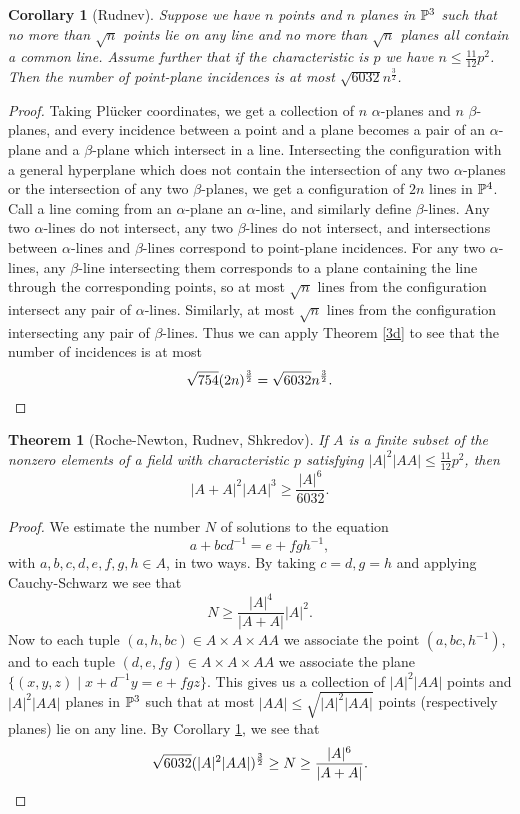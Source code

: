 \documentclass[letterpaper,11pt]{article}
\newtheorem{thm}{Theorem}
\newtheorem{cor}{Corollary}
\theoremstyle{definition}
\theoremstyle{remark}
\begin{document}
\begin{cor}[Rudnev]\label{point-plane} Suppose we have $n$ points and $n$ planes in $\mathbb{P}^3$ such that no more than $\sqrt{n}$ points lie on any line and no more than $\sqrt{n}$ planes all contain a common line. Assume further that if the characteristic is $p$ we have $n \le \frac{11}{12}p^2$. Then the number of point-plane incidences is at most $\sqrt{6032}n^{\frac{3}{2}}$.
\end{cor}
\begin{proof} Taking Pl\"ucker coordinates, we get a collection of $n$ $\alpha$-planes and $n$ $\beta$-planes, and every incidence between a point and a plane becomes a pair of an $\alpha$-plane and a $\beta$-plane which intersect in a line. Intersecting the configuration with a general hyperplane which does not contain the intersection of any two $\alpha$-planes or the intersection of any two $\beta$-planes, we get a configuration of $2n$ lines in $\mathbb{P}^4$. Call a line coming from an $\alpha$-plane an $\alpha$-line, and similarly define $\beta$-lines. Any two $\alpha$-lines do not intersect, any two $\beta$-lines do not intersect, and intersections between $\alpha$-lines and $\beta$-lines correspond to point-plane incidences. For any two $\alpha$-lines, any $\beta$-line intersecting them corresponds to a plane containing the line through the corresponding points, so at most $\sqrt{n}$ lines from the configuration intersect any pair of $\alpha$-lines. Similarly, at most $\sqrt{n}$ lines from the configuration intersecting any pair of $\beta$-lines. Thus we can apply Theorem \ref{3d} to see that the number of incidences is at most
\[
\sqrt{754}(2n)^{\frac{3}{2}} = \sqrt{6032}n^{\frac{3}{2}}.\qedhere
\]
\end{proof}

\begin{thm}[Roche-Newton, Rudnev, Shkredov] If $A$ is a finite subset of the nonzero elements of a field with characteristic $p$ satisfying $|A|^2|AA| \le \frac{11}{12}p^2$, then
\[
|A+A|^2|AA|^3 \ge \frac{|A|^6}{6032}.
\]
\end{thm}
\begin{proof} We estimate the number $N$ of solutions to the equation
\[
a+bcd^{-1} = e + fgh^{-1},
\]
with $a,b,c,d,e,f,g,h \in A$, in two ways. By taking $c=d, g=h$ and applying Cauchy-Schwarz we see that
\[
N \ge \frac{|A|^4}{|A+A|}|A|^2.
\]
Now to each tuple $(a,h,bc) \in A\times A\times AA$ we associate the point $(a,bc,h^{-1})$, and to each tuple $(d,e,fg) \in A\times A\times AA$ we associate the plane $\{(x,y,z) \mid x+d^{-1}y = e + fgz\}$. This gives us a collection of $|A|^2|AA|$ points and $|A|^2|AA|$ planes in $\mathbb{P}^3$ such that at most $|AA| \le \sqrt{|A|^2|AA|}$ points (respectively planes) lie on any line. By Corollary \ref{point-plane}, we see that
\[
\sqrt{6032}(|A|^2|AA|)^{\frac{3}{2}} \ge N \ge \frac{|A|^6}{|A+A|}.\qedhere
\]
\end{proof}
\end{document}
